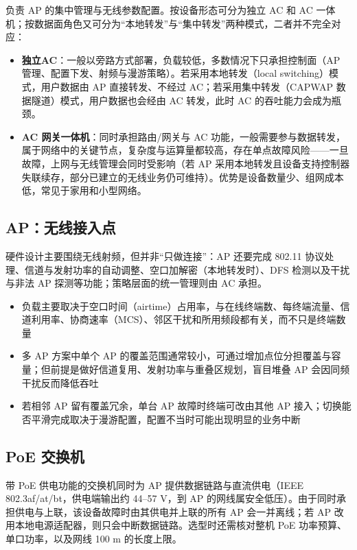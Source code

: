 \documentclass[UTF8]{ctexbook}
\begin{document}
负责 AP 的集中管理与无线参数配置。按设备形态可分为独立 AC 和 AC 一体机；按数据面角色又可分为\textquotedblleft 本地转发\textquotedblright 与\textquotedblleft 集中转发\textquotedblright 两种模式，二者并不完全对应：

\begin{itemize}
  \item \textbf{独立AC}：一般以旁路方式部署，负载较低，多数情况下只承担控制面（AP 管理、配置下发、射频与漫游策略）。若采用本地转发（local switching）模式，用户数据由 AP 直接转发、不经过 AC；若采用集中转发（CAPWAP 数据隧道）模式，用户数据也会经由 AC 转发，此时 AC 的吞吐能力会成为瓶颈。
  \item \textbf{AC 网关一体机}：同时承担路由/网关与 AC 功能，一般需要参与数据转发，属于网络中的关键节点，复杂度与运算量都较高，存在单点故障风险——一旦故障，上网与无线管理会同时受影响（若 AP 采用本地转发且设备支持控制器失联续存，部分已建立的无线业务仍可维持）。优势是设备数量少、组网成本低，常见于家用和小型网络。
\end{itemize}

\subsection{AP：无线接入点}

硬件设计主要围绕无线射频，但并非\textquotedblleft 只做连接\textquotedblright：AP 还要完成 802.11 协议处理、信道与发射功率的自动调整、空口加解密（本地转发时）、DFS 检测以及干扰与非法 AP 探测等功能；策略层面的统一管理则由 AC 承担。

\begin{itemize}
  \item 负载主要取决于空口时间（airtime）占用率，与在线终端数、每终端流量、信道利用率、协商速率（MCS）、邻区干扰和所用频段都有关，而不只是终端数量
  \item 多 AP 方案中单个 AP 的覆盖范围通常较小，可通过增加点位分担覆盖与容量；但前提是做好信道复用、发射功率与重叠区规划，盲目堆叠 AP 会因同频干扰反而降低吞吐
  \item 若相邻 AP 留有覆盖冗余，单台 AP 故障时终端可改由其他 AP 接入；切换能否平滑完成取决于漫游配置，配置不当时可能出现明显的业务中断
\end{itemize}

\subsection{PoE 交换机}

带 PoE 供电功能的交换机同时为 AP 提供数据链路与直流供电（IEEE 802.3af/at/bt，供电端输出约 44--57 V，到 AP 的网线属安全低压）。由于同时承担供电与上联，该设备故障时由其供电并上联的所有 AP 会一并离线；若 AP 改用本地电源适配器，则只会中断数据链路。选型时还需核对整机 PoE 功率预算、单口功率，以及网线 100 m 的长度上限。
\end{document}
